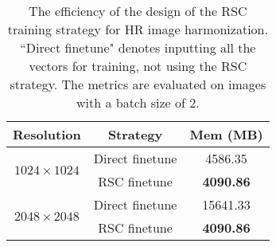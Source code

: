 \documentclass[10pt,journal,twocolumn,twoside]{IEEEtran}
\begin{document}
\begin{table}[t]
\caption{The efficiency of the design of the RSC training strategy for HR image harmonization. ``Direct finetune" denotes inputting all the vectors for training, not using the RSC strategy.  The metrics are evaluated on images with a batch size of 2.}
    \label{tab:Efficiency of RSC}
\centering
\begin{tabular}{c|c|c}
\hline
Resolution            & Strategy        & Mem (MB)         \\ \hline
\multirow{2}{*}{$1024\times1024$} & Direct finetune & 4586.35          \\
                      & RSC finetune    & \textbf{4090.86} \\ \hline
\multirow{2}{*}{$2048\times2048$} & Direct finetune & 15641.33         \\
                      & RSC finetune    & \textbf{4090.86} \\ \hline
\end{tabular}
    
\end{table}



\begin{table}[t]
    \caption{Demonstration of the effectiveness of MLPs decoupling. The experiments are conducted on LR iHarmony4 dataset.}
    \label{tab:Decouple}
    \renewcommand{\arraystretch}{1.1} 
    \centering

\end{table}
\end{document}
